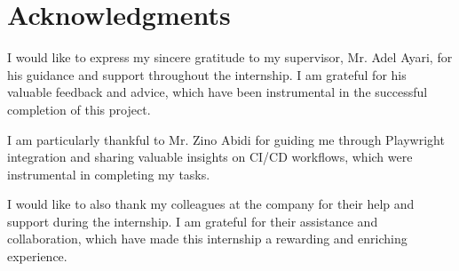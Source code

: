 \chapter*{Acknowledgments}

I would like to express my sincere gratitude to my supervisor, Mr. Adel Ayari, for his guidance and support throughout the internship. I am grateful for his valuable feedback and advice, which have been instrumental in the successful completion of this project.

I am particularly thankful to Mr. Zino Abidi for guiding me through Playwright integration and sharing valuable insights on CI/CD workflows, which were instrumental in completing my tasks.

I would like to also thank my colleagues at the company for their help and support during the internship. I am grateful for their assistance and collaboration, which have made this internship a rewarding and enriching experience.